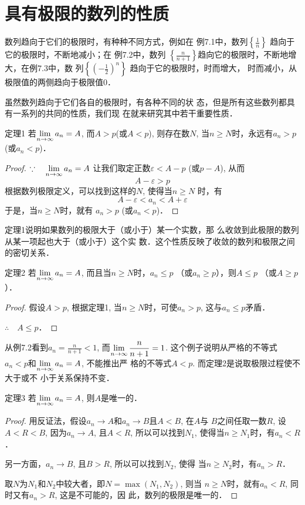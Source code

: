 \section{具有极限的数列的性质}
数列趋向于它们的极限时，有种种不同方式，例如在
例7.1中，数列$\left\{\frac{1}{n}\right\}$
趋向于它的极限时，不断地减小；在
例7.2中，数列
$\left\{\frac{n}{n+1}\right\}$趋向它的极限时，不断地增大，在例7.3中，数
列$\left\{\left(-\frac{1}{2}\right)^n\right\}$
趋向于它的极限时，时而增大，
时而减小，从极限值的两侧趋向于极限值0．

虽然数列趋向于它们各自的极限时，有各种不同的状
态，但是所有这些数列都具有一系列的共同的性质，我们现
在就来研究其中若干重要性质．

\begin{blk}{定理1}
     若$\displaystyle\lim_{n\to\infty}a_n=A$, 而$A>p$(或$A<p$), 则存在数$N$, 当$n\ge N$时，永远有$a_n>p$(或$a_n<p$)．
\end{blk}

\begin{proof}
$\because\quad \displaystyle\lim_{n\to\infty}a_n=A$
让我们取定正数$\varepsilon<A-p$ (或$p-A$), 从而
$$A-\varepsilon>p$$
根据数列极限定义，可以找到这样的$N$, 使得当$n\ge N$
时，有
$$A-\varepsilon<a_n<A+\varepsilon$$
于是，当$n\ge N$时，就有
$a_n>p$ (或$a_n<p$)．    
\end{proof}

定理1说明如果数列的极限大于（或小于）某一个实数，那
么收敛到此极限的数列从某一项起也大于（或小于）这个实
数．这个性质反映了收敛的数列和极限之间的密切关系．

\begin{blk}{定理2}
若$\displaystyle\lim_{n\to\infty}a_n=A$, 而且当$n\ge N$时，$a_n\le p$ （或$a_n\ge p$），则$A\le p$ （或$A\ge p$）．
\end{blk}

\begin{proof}
 假设$A>p$, 根据定理1, 当$n\ge N$时，可使$a_n>
p$, 这与$a_n\le p$矛盾．

$\therefore\quad A\le p$．
\end{proof}

从例7.2看到$a_n=\frac{n}{n+1}<1$, 而$\displaystyle\lim_{n\to\infty}\dfrac{n}{n+1}=1$. 这个例子说明从严格的不等式$a_n<p$和$\displaystyle\lim_{n\to\infty}a_n=A$, 不能推出严
格的不等式$A<p$. 而定理2是说取极限过程使不大于或不
小于关系保持不变．

\begin{blk}{定理3}
    若$\displaystyle\lim_{n\to\infty}a_n=A$, 则$A$是唯一的．
\end{blk}

\begin{proof}
用反证法，假设$a_n\to A$和$a_n\to B$且$A<B$, 在$A$与
$B$之间任取一数$R$, 设$A<R<B$, 因为$a_n\to A$, 且$A<R$,
所以可以找到$N_1$, 使得当$n\ge N_1$时，有$a_n<R$．

另一方面，$a_n\to B$, 且$B>R$, 所以可以找到$N_2$, 使得
当$n\ge N_2$时，有$a_n>R$．

取$N$为$N_1$和$N_2$中较大者，即$N=\max(N_1,N_2)$, 则当
$n\ge N$时，就有$a_n<R$, 同时又有$a_n>R$, 这是不可能的，因
此，数列的极限是唯一的．
\end{proof}

